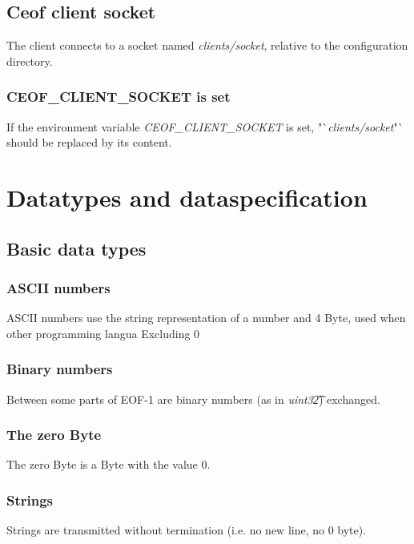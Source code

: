 \documentclass[12pt,a4paper]{article}
\begin{document}
\subsection{Ceof client socket}
The client connects to a socket named \textit{clients/socket}, relative
to the configuration directory.
\subsubsection{CEOF\_CLIENT\_SOCKET is set}
If the environment variable \textit{CEOF\_CLIENT\_SOCKET} is set,
"`\textit{clients/socket}"` should be replaced by its content.
\section{Datatypes and dataspecification}
\subsection{Basic data types}
\subsubsection{ASCII numbers}
ASCII numbers use the string representation of a number and
4 Byte, used when other programming langua
Excluding 0
\subsubsection{Binary numbers}
Between some parts of EOF-1 are binary numbers (as in \textit{uint32\t})
exchanged.
\subsubsection{The zero Byte}
The zero Byte is a Byte with the value 0.
\subsubsection{Strings}
Strings are transmitted without termination (i.e. no new line, no 0 byte).
\end{document}
